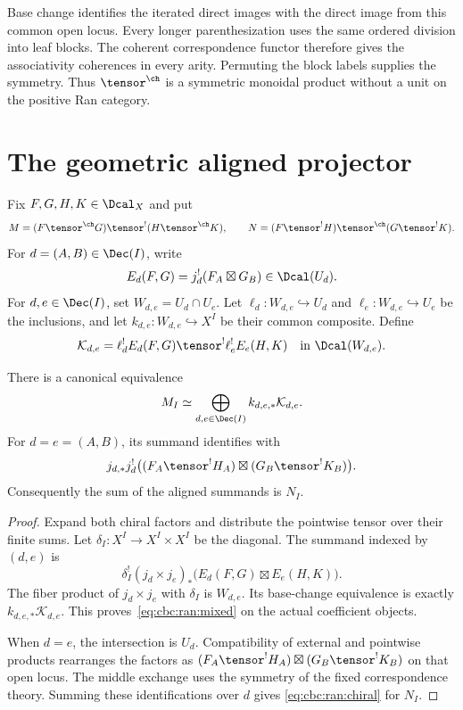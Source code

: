 Base change identifies the iterated direct images with the direct image
from this common open locus. Every longer parenthesization uses the same
ordered division into leaf blocks. The coherent correspondence functor
therefore gives the associativity coherences in every arity.
Permuting the block labels supplies the symmetry.
Thus $\tensor^{\ch}$ is a symmetric monoidal product without a unit
on the positive Ran category.

\section{The geometric aligned projector}
Fix $F,G,H,K\in\Dcal_X$ and put
\[
 M=(F\tensor^{\ch}G)\tensor^!(H\tensor^{\ch}K),\qquad
 N=(F\tensor^!H)\tensor^{\ch}(G\tensor^!K).
\]
For $d=(A,B)\in\Dec(I)$, write
\[
 E_d(F,G)=j_d^!(F_A\boxtimes G_B)\in\Dcal(U_d).
\]
For $d,e\in\Dec(I)$, set $W_{d,e}=U_d\cap U_e$.
Let $\ell_d:W_{d,e}\hookrightarrow U_d$ and
$\ell_e:W_{d,e}\hookrightarrow U_e$ be the inclusions, and let
$k_{d,e}:W_{d,e}\hookrightarrow X^I$ be their common composite.
Define
\[
 \mathcal K_{d,e}
 =\ell_d^!E_d(F,G)\tensor^!\ell_e^!E_e(H,K)
 \quad\text{in }\Dcal(W_{d,e}).
\]

\begin{lemma}
\label{cbc:ran:mixed}
There is a canonical equivalence
\begin{equation}
 M_I\simeq\bigoplus_{d,e\in\Dec(I)}k_{d,e,*}\mathcal K_{d,e}.
 \label{eq:cbc:ran:mixed}
\end{equation}
For $d=e=(A,B)$, its summand identifies with
\[
 j_{d,*}j_d^!\bigl((F_A\tensor^!H_A)\boxtimes
                         (G_B\tensor^!K_B)\bigr).
\]
Consequently the sum of the aligned summands is $N_I$.
\end{lemma}
\begin{proof}
Expand both chiral factors and distribute the pointwise tensor over
their finite sums. Let $\delta_I:X^I\to X^I\times X^I$ be the diagonal.
The summand indexed by $(d,e)$ is
\[
 \delta_I^!(j_d\times j_e)_*
       \bigl(E_d(F,G)\boxtimes E_e(H,K)\bigr).
\]
The fiber product of $j_d\times j_e$ with $\delta_I$ is $W_{d,e}$.
Its base-change equivalence is exactly $k_{d,e,*}\mathcal K_{d,e}$.
This proves~\eqref{eq:cbc:ran:mixed} on the actual coefficient objects.

When $d=e$, the intersection is $U_d$.
Compatibility of external and pointwise products rearranges the factors
as $(F_A\tensor^!H_A)\boxtimes(G_B\tensor^!K_B)$ on that open locus.
The middle exchange uses the symmetry of the fixed correspondence theory.
Summing these identifications over $d$ gives
\eqref{eq:cbc:ran:chiral} for $N_I$.
\end{proof}

